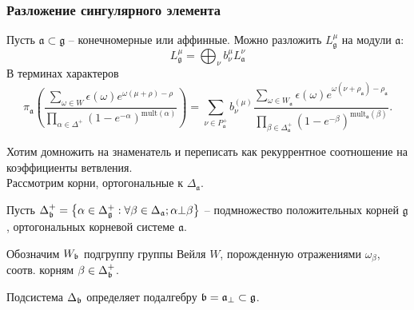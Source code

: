 \documentclass[pdftex]{beamer}
\newcommand{\gf}{\mathfrak{g}}
\newcommand{\af}{\mathfrak{a}}
\newcommand{\afb}{\mathfrak{a}_{\bot}}
\theoremstyle{definition} \newtheorem{Def}{Определение}
\begin{document}
\begin{frame}
  \frametitle{Разложение сингулярного элемента}
  Пусть $\af\subset\gf$ -- конечномерные или аффинные. Можно разложить $L^{\mu}_{\gf}$ на модули $\af$:
  \begin{equation*}
    L^{\mu}_{\gf}=\bigoplus_{\nu} b^{\mu}_{\nu} L^{\nu}_{\af}
  \end{equation*}
  В терминах характеров
  \begin{equation*}
\pi _{\af}\left( \frac{\sum_{\omega \in W}\epsilon (\omega )e^{\omega (\mu +\rho )-\rho }}
  {\prod_{\alpha \in \Delta ^{+}}(1-e^{-\alpha })^{\mathrm{mult}(\alpha )}}\right) =
\sum_{\nu \in P_{\af}^{+}}b_{\nu }^{(\mu )}
\frac{\sum_{\omega \in W_{\af}}\epsilon (\omega )e^{\omega (\nu +\rho _{\af})-\rho _{\af}}}
{\prod_{\beta \in \Delta _{\af}^{+}}(1-e^{-\beta })^{\mathrm{mult}_{\af}(\beta )}}.  
\end{equation*}

Хотим домножить на знаменатель и переписать как рекуррентное соотношение на коэффициенты ветвления. \\

Рассмотрим корни, ортогональные к $\Delta_{\af}$.

Пусть $\Delta^{+}_{\frak{b}}=\left\{\alpha\in \Delta^{+}_{\frak{g}}:\forall
\beta\in\Delta_{\af} ; \alpha\bot \beta\right\}$ -- подмножество положительных корней $\gf$, ортогональных корневой системе $\af$.

Обозначим  $W_{\frak{b}}$ подгруппу группы Вейля $W$, порожденную отражениями $\omega _{\beta }$, соотв. корням $\beta \in \Delta
_{\frak{b}}^{+}$.

Подсистема $\Delta _{\frak{b}}$ определяет подалгебру $\frak{b}=\afb\subset\gf$.
\end{frame}
\end{document}
